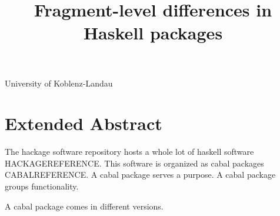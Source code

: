 \documentclass[preprint]{sigplanconf}
\begin{document}
\setlength{\pdfpageheight}{\paperheight}
\setlength{\pdfpagewidth}{\paperwidth}






\title{Fragment-level differences in Haskell packages}

           {University of Koblenz-Landau}
           {}

\maketitle





\section*{Extended Abstract}

The hackage software repository hosts a whole lot of haskell software HACKAGEREFERENCE. This software is organized as cabal packages CABALREFERENCE. A cabal package serves a purpose. A cabal package groups functionality.

A cabal package comes in different versions.
\end{document}
